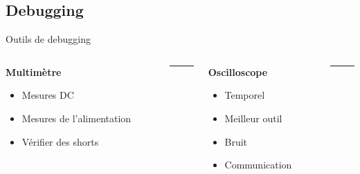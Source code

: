 \subsection{Debugging}

\begin{frame}[t]{Outils de debugging}
    \vspace{-8pt}
    \begin{columns}[T]
        \begin{column}{0.25\textwidth}
            \vspace{-12pt}
            \begin{center}
                \textbf{Multimètre}
            \end{center}
            \begin{itemize}
                \item Mesures DC
                \bigskip
                \item Mesures de l'alimentation
                \item Vérifier des shorts
            \end{itemize}
        \end{column}
        \begin{column}{0.001\textwidth}
            \rule{0.1mm}{0.85\textheight}
        \end{column}

        \begin{column}{0.25\textwidth}
            \vspace{-12pt}
            \begin{center}
                \textbf{Oscilloscope}
            \end{center}
            \begin{itemize}
                \item Temporel
                \item Meilleur outil
                \bigskip
                \item Bruit
                \item Communication
            \end{itemize}
        \end{column}
        \begin{column}{0.001\textwidth}
            \rule{0.1mm}{0.85\textheight}
        \end{column}


\end{columns}
\end{frame}
